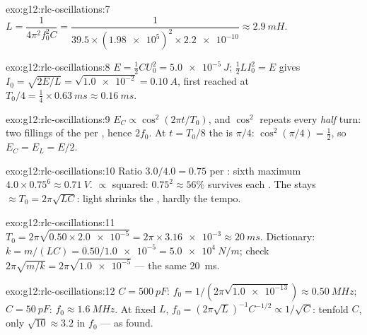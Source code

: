 \begin{solution}{exo:g12:rlc-oscillations:7}
$L = \dfrac{1}{4\pi^2 f_0^2 C} = \dfrac{1}{39.5 \times
(\num{1.98e5})^2 \times \num{2.2e-10}} \approx \qty{2.9}{mH}$.
\end{solution}

\begin{solution}{exo:g12:rlc-oscillations:8}
$E = \tfrac12 CU_0^2 = \qty{5.0e-5}{J}$; $\tfrac12 LI_0^2 = E$ gives
$I_0 = \sqrt{2E/L} = \sqrt{\num{1.0e-2}} = \qty{0.10}{A}$, first
reached at $T_0/4 = \tfrac14 \times \qty{0.63}{ms} \approx
\qty{0.16}{ms}$.
\end{solution}

\begin{solution}{exo:g12:rlc-oscillations:9}
$E_C \propto \cos^2(2\pi t/T_0)$, and $\cos^2$ repeats every
\emph{half} turn: two fillings of the  per , hence
$2f_0$. At $t = T_0/8$ the  is $\pi/4$:
$\cos^2(\pi/4) = \tfrac12$, so $E_C = E_L = E/2$.
\end{solution}

\begin{solution}{exo:g12:rlc-oscillations:10}
Ratio $3.0/4.0 = 0.75$ per : sixth maximum
$4.0 \times 0.75^6 \approx \qty{0.71}{V}$.  $\propto$ 
squared: $0.75^2 \approx 56\%$ survives each . The
 stays $\approx T_0 = 2\pi\sqrt{LC}$: light 
shrinks the , hardly the tempo.
\end{solution}

\begin{solution}{exo:g12:rlc-oscillations:11}
$T_0 = 2\pi\sqrt{0.50 \times \num{2.0e-5}} = 2\pi \times
\num{3.16e-3} \approx \qty{20}{ms}$. Dictionary: $k = m/(LC) =
0.50/\num{1.0e-5} = \qty{5.0e4}{N/m}$; check
$2\pi\sqrt{m/k} = 2\pi\sqrt{\num{1.0e-5}}$ --- the same \qty{20}{ms}.
\end{solution}

\begin{solution}{exo:g12:rlc-oscillations:12}
$C = \qty{500}{pF}$: $f_0 = 1/(2\pi\sqrt{\num{1.0e-13}}) \approx
\qty{0.50}{MHz}$; $C = \qty{50}{pF}$: $f_0 \approx \qty{1.6}{MHz}$.
At fixed $L$, $f_0 = (2\pi\sqrt{L})^{-1} C^{-1/2} \propto 1/\sqrt{C}$:
tenfold $C$, only $\sqrt{10} \approx 3.2$ in $f_0$ --- as found.
\end{solution}

